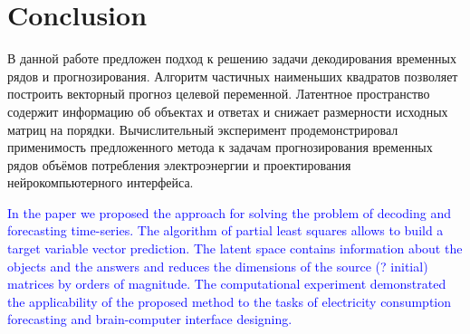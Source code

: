 \documentclass[12pt,twoside]{article}
\begin{document}
\section{Conclusion}
В данной работе предложен подход к решению задачи декодирования временных рядов и прогнозирования. 
Алгоритм частичных наименьших квадратов позволяет построить векторный прогноз целевой переменной. 
Латентное пространство содержит информацию об объектах и ответах и снижает размерности исходных матриц на порядки. 
Вычислительный эксперимент продемонстрировал применимость предложенного метода к задачам прогнозирования временных рядов объёмов потребления электроэнергии и проектирования нейрокомпьютерного интерфейса.

\textcolor{blue}{
In the paper we proposed the approach for solving the problem of decoding and forecasting time-series. 
The algorithm of partial least squares allows to build a target variable vector prediction. 
The latent space contains information about the objects and the answers and reduces the dimensions of the source (? initial) matrices by orders of magnitude. 
The computational experiment demonstrated the applicability of the proposed method to the tasks of electricity consumption forecasting and brain-computer interface designing.}




\end{document}
